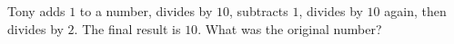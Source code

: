 Tony adds $1$ to a number, divides by $10$, subtracts $1$, divides by $10$ again, then divides by $2$. The final result is $10$. What was the original number?
